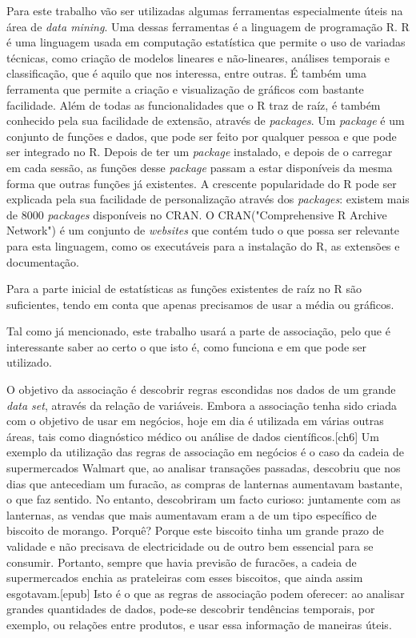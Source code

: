 Para este trabalho vão ser utilizadas algumas ferramentas especialmente úteis na área de \textit{data mining}. Uma dessas ferramentas é a linguagem de programação R. 
R é uma linguagem usada em computação estatística que permite o uso de variadas técnicas, como criação de modelos lineares e não-lineares, análises temporais e classificação, que é aquilo que nos interessa, entre outras. É também uma ferramenta que permite a criação e visualização de gráficos com bastante facilidade.
Além de todas as funcionalidades que o R traz de raíz, é também conhecido pela sua facilidade de extensão, através de \textit{packages}. Um \textit{package} é um conjunto de funções e dados, que pode ser feito por qualquer pessoa e que pode ser integrado no R. Depois de ter um \textit{package} instalado, e depois de o carregar em cada sessão, as funções desse \textit{package} passam a estar disponíveis da mesma forma que outras funções já existentes. A crescente popularidade do R pode ser explicada pela sua facilidade de personalização através dos \textit{packages}: existem mais de 8000 \textit{packages} disponíveis no CRAN. O CRAN("Comprehensive R Archive Network") é um conjunto de \textit{websites} que contém tudo o que possa ser relevante para esta linguagem, como os executáveis para a instalação do R, as extensões e documentação.

Para a parte inicial de estatísticas as funções existentes de raíz no R são suficientes, tendo em conta que apenas precisamos de usar a média ou gráficos.

Tal como já mencionado, este trabalho usará a parte de associação, pelo que é interessante saber ao certo o que isto é, como funciona e em que pode ser utilizado. 

O objetivo da associação é descobrir regras escondidas nos dados de um grande \textit{data set}, através da relação de variáveis. Embora a associação tenha sido criada com o objetivo de usar em negócios, 	hoje em dia é utilizada em várias outras áreas, tais como diagnóstico médico ou análise de dados científicos.[ch6]
Um exemplo da utilização das regras de associação em negócios é o caso da cadeia de supermercados Walmart que, ao analisar transações passadas, descobriu que nos dias que antecediam um furacão, as compras de lanternas aumentavam bastante, o que faz sentido. No entanto, descobriram um facto curioso: juntamente com as lanternas, as vendas que mais aumentavam eram a de um tipo específico de biscoito de morango. Porquê? Porque este biscoito tinha um grande prazo de validade e não precisava de electricidade ou de outro bem essencial para se consumir. Portanto, sempre que havia previsão de furacões, a cadeia de supermercados enchia as prateleiras com esses biscoitos, que ainda assim esgotavam.[epub] 
Isto é o que as regras de associação podem oferecer: ao analisar grandes quantidades de dados, pode-se descobrir tendências temporais, por exemplo, ou relações entre produtos, e usar essa informação de maneiras úteis. 

